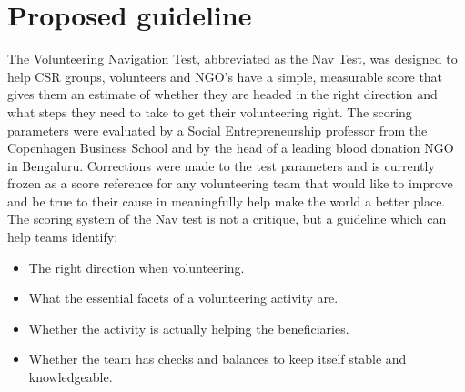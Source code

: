 \documentclass[conference]{IEEEtran}
\begin{document}
\section{Proposed guideline}
The Volunteering Navigation Test, abbreviated as the Nav Test, was designed to help CSR groups, volunteers and NGO's have a simple, measurable score that gives them an estimate of whether they are headed in the right direction and what steps they need to take to get their volunteering right. The scoring parameters were evaluated by a Social Entrepreneurship professor from the Copenhagen Business School and by the head of a leading blood donation NGO in Bengaluru. Corrections were made to the test parameters and is currently frozen as a score reference for any volunteering team that would like to improve and be true to their cause in meaningfully help make the world a better place.
The scoring system of the Nav test is not a critique, but a guideline which can help teams identify:
\begin{itemize}
\item The right direction when volunteering.
\item What the essential facets of a volunteering activity are.
\item Whether the activity is actually helping the beneficiaries.
\item Whether the team has checks and balances to keep itself stable and knowledgeable.
\end{itemize}
\end{document}
